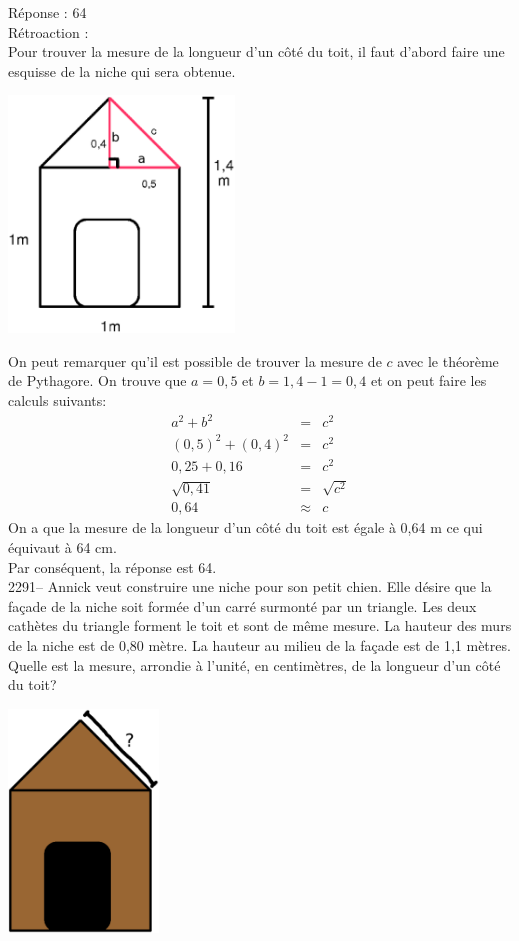 \documentclass[letterpaper, 12pt]{article}
\begin{document}
R\'eponse : 64\\

R\'etroaction :\\
Pour trouver la mesure de la longueur d'un c\^ot\'e du toit, il faut d'abord faire une esquisse de la niche qui sera obtenue.\\
\begin{center}
 \includegraphics[width=6cm,bb=14 14 427 478]{Niche2290mesures.eps}
\end{center}
On peut remarquer qu'il est possible de trouver la mesure de $c$ avec le th\'eor\`eme de Pythagore. On trouve que $a=0,5$ et $b=1,4-1=0,4$ et on peut faire les calculs suivants:
\begin{eqnarray*}
a^{2}+b^{2}&=&c^{2}\\
(0,5)^{2}+(0,4)^{2}&=&c^{2}\\
0,25+0,16&=&c^{2}\\
\sqrt{0,41}&=&\sqrt{c^{2}}\\
0,64&\approx&c
\end{eqnarray*}
On a que la mesure de la longueur d'un c\^ot\'e du toit est \'egale \`a 0,64 m ce qui \'equivaut \`a 64 cm.\\
Par cons\'equent, la r\'eponse est 64.\\

2291-- Annick veut construire une niche pour son petit chien. Elle d\'esire que la fa\c cade de la niche soit form\'ee d'un carr\'e surmont\'e par un triangle. Les deux cath\`etes du triangle forment le toit et sont de m\^eme mesure. La hauteur des murs de la niche est de 0,80 m\`etre. La hauteur au milieu de la fa\c cade est de 1,1 m\`etres. Quelle est la mesure, arrondie \`a l'unit\'e, en centim\`etres, de la longueur d'un c\^ot\'e du toit?
\begin{center}
 \includegraphics[width=4cm,bb=14 14 627 807]{Niche2290.eps}
\end{center}
\end{document}
